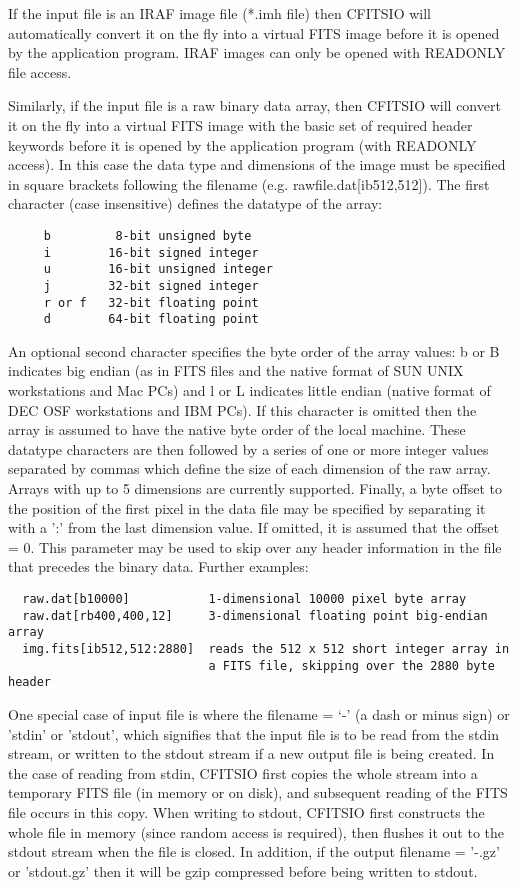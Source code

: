\documentclass[11pt]{book}
\begin{document}
If the input file is an IRAF image file (*.imh file) then CFITSIO will
automatically convert it on the fly into a virtual FITS image before it
is opened by the application program.  IRAF images can only be opened
with READONLY file access.

Similarly, if the input file is a raw binary data array, then CFITSIO
will convert it on the fly into a virtual FITS image with the basic set
of required header keywords before it is opened by the application
program (with READONLY access).  In this case the data type and
dimensions of the image must be specified in square brackets following
the filename (e.g. rawfile.dat[ib512,512]). The first character (case
insensitive) defines the datatype of the array:

\begin{verbatim}
     b         8-bit unsigned byte
     i        16-bit signed integer
     u        16-bit unsigned integer
     j        32-bit signed integer
     r or f   32-bit floating point
     d        64-bit floating point
\end{verbatim}
An optional second character specifies the byte order of the array
values: b or B indicates big endian (as in FITS files and the native
format of SUN UNIX workstations and Mac PCs) and l or L indicates
little endian (native format of DEC OSF workstations and IBM PCs).  If
this character is omitted then the array is assumed to have the native
byte order of the local machine.  These datatype characters are then
followed by a series of one or more integer values separated by commas
which define the size of each dimension of the raw array.  Arrays with
up to 5 dimensions are currently supported.  Finally, a byte offset to
the position of the first pixel in the data file may be specified by
separating it with a ':' from the last dimension value.  If omitted, it
is assumed that the offset = 0.  This parameter may be used to skip
over any header information in the file that precedes the binary data.
Further examples:

\begin{verbatim}
  raw.dat[b10000]           1-dimensional 10000 pixel byte array
  raw.dat[rb400,400,12]     3-dimensional floating point big-endian array
  img.fits[ib512,512:2880]  reads the 512 x 512 short integer array in
                            a FITS file, skipping over the 2880 byte header
\end{verbatim}

One special case of input file is where the filename = `-' (a dash or
minus sign) or 'stdin' or 'stdout', which signifies that the input file
is to be read from the stdin stream, or written to the stdout stream if
a new output file is being created.  In the case of reading from stdin,
CFITSIO first copies the whole stream into a temporary FITS file (in
memory or on disk), and subsequent reading of the FITS file occurs in
this copy.  When writing to stdout, CFITSIO first constructs the whole
file in memory (since random access is required), then flushes it out
to the stdout stream when the file is closed.   In addition, if the
output filename = '-.gz' or 'stdout.gz' then it will be gzip compressed
before being written to stdout.
\end{document}
